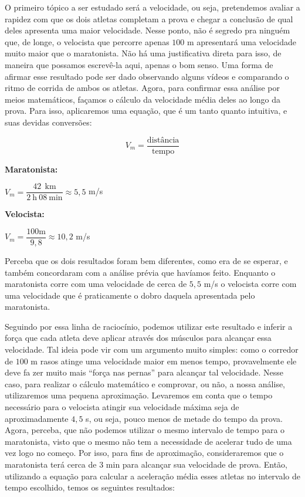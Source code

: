 \begin{multicols}{2}
O primeiro tópico a ser estudado será a velocidade, ou seja, pretendemos avaliar a rapidez com que os dois atletas completam a prova e chegar a conclusão de qual deles apresenta uma maior velocidade. Nesse ponto, não é segredo pra ninguém que, de longe, o velocista que percorre apenas $100$ m apresentará uma velocidade muito maior que o maratonista. Não há uma justificativa direta para isso, de maneira que possamos escrevê-la aqui, apenas o bom senso. Uma forma de afirmar esse resultado pode ser dado observando alguns vídeos e comparando o ritmo de corrida de ambos os atletas. Agora, para confirmar essa análise por meios matemáticos, façamos o cálculo da velocidade média deles ao longo da prova. Para isso, aplicaremos uma equação, que é um tanto quanto intuitiva, e suas devidas conversões:

\begin{equation*}
    V_{m} = \dfrac{\text{distância}}{\text{tempo}}
\end{equation*}

\noindent\textbf{Maratonista:}\par %

$V_m = \dfrac{42 \: \: \text{km}}{2\: \text{h} \: 08 \: \text{min}} \approx  5,5$ m/s

\noindent\textbf{Velocista:}\par

$V_m = \dfrac{100 \text{m}}{9,8} \approx 10,2$ m/s

Perceba que os dois resultados foram bem diferentes, como era de se esperar, e também concordaram com a análise prévia que havíamos feito. Enquanto o maratonista corre com uma velocidade de cerca de $5,5$ m/s o velocista corre com uma velocidade que é praticamente o dobro daquela apresentada pelo maratonista.

Seguindo por essa linha de raciocínio, podemos utilizar este resultado e inferir a força que cada atleta deve aplicar através dos músculos para alcançar essa velocidade. Tal ideia pode vir com um argumento muito simples: como o corredor de $100$ m rasos atinge uma velocidade maior em menos tempo, provavelmente ele deve fa zer muito mais ``força nas pernas'' para alcançar tal velocidade. Nesse caso, para realizar o cálculo matemático e comprovar, ou não, a nossa análise, utilizaremos uma pequena aproximação. Levaremos em conta que o tempo necessário para o velocista atingir sua velocidade máxima seja de aproximadamente $4,5$ s, ou seja, pouco menos de metade do tempo da prova. Agora, perceba, que não podemos utilizar o mesmo intervalo de tempo para o maratonista, visto que o mesmo não tem a necessidade de acelerar tudo de uma vez logo no começo. Por isso, para fins de aproximação, consideraremos que o maratonista terá cerca de $3$ min para alcançar sua velocidade de prova. Então, utilizando a equação para calcular a aceleração média esses atletas no intervalo de tempo escolhido, temos os seguintes resultados:


\end{multicols}
